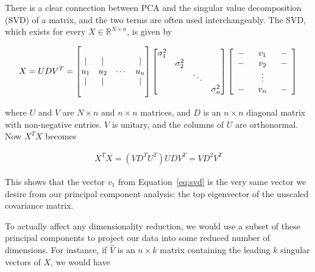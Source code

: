 There is a clear connection between PCA and the singular value
decomposition (SVD) of a matrix, and the two terms are often used
interchangeably. The SVD, which exists for every
$X \in \mathbb{R}^{N \times n}$, is given by

\begin{align}
  X = U D V^T =   
  \begin{bmatrix}
    & & & \\ 
    | & | &  & |  \\
    u_1 & u_2 & \cdots & u_n \\
    | & | &  & |  \\
    & & &  \\
  \end{bmatrix}
  \begin{bmatrix} 
    \sigma_1^2 & & & \\
    & \sigma_2^2 & & \\
    & & \ddots & \\
    & &  & \sigma_n^2 \\
  \end{bmatrix}
  \left[ \begin{array}{ccccc}
           - & \multicolumn{3}{c}{v_1} & - \\
           - & \multicolumn{3}{c}{v_2} & - \\
             & & \vdots & & \\
           - & \multicolumn{3}{c}{v_n} & - \\
         \end{array} \right]
  \label{eq:svd}
\end{align}

where $U$ and $V$ are $N \times n$ and $n \times n$ matrices, and $D$
is an $n \times n$ diagonal matrix with non-negative entries. $V$ is
unitary, and the columns of $U$ are orthonormal. Now $X^TX$ becomes

\begin{align*}
  X^T X = (V D^T U^T) U D V^T = V D^2 V^T
\end{align*}

This shows that the vector $v_1$ from Equation~\ref{eq:svd} is the
very same vector we desire from our principal component analysis: the
top eigenvector of the unscaled covariance matrix.

To actually affect any dimensionality reduction, we would use a subset
of these principal components to project our data into some reduced
number of dimensions. For instance, if $\hat{V}$ is an $n \times k$
matrix containing the leading $k$ singular vectors of $X$, we would
have

